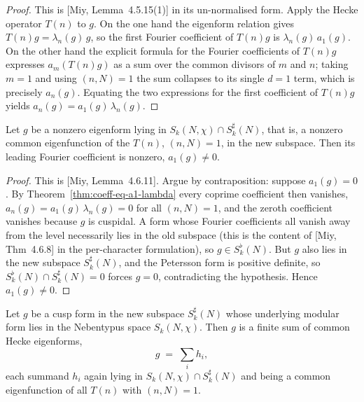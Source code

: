 \begin{proof}
\leanok
This is [Miy, Lemma~4.5.15(1)] in its un-normalised form. Apply the Hecke operator $T(n)$ to $g$. On the
one hand the eigenform relation gives $T(n)g=\lambda_n(g)\,g$, so the first Fourier coefficient of $T(n)g$
is $\lambda_n(g)\,a_1(g)$. On the other hand the explicit formula for the Fourier coefficients of $T(n)g$
expresses $a_m(T(n)g)$ as a sum over the common divisors of $m$ and $n$; taking $m=1$ and using $(n,N)=1$
the sum collapses to its single $d=1$ term, which is precisely $a_n(g)$. Equating the two expressions for
the first coefficient of $T(n)g$ yields $a_n(g)=a_1(g)\,\lambda_n(g)$.
\end{proof}

\begin{theorem}\label{thm:a1-ne-zero}
\leanok
Let $g$ be a nonzero eigenform lying in $S_k(N,\chi)\cap S_k^{\sharp}(N)$, that is, a nonzero common
eigenfunction of the $T(n)$, $(n,N)=1$, in the new subspace. Then its leading Fourier coefficient is
nonzero, $a_1(g)\neq 0$.
\end{theorem}

\begin{proof}
\leanok
This is [Miy, Lemma~4.6.11]. Argue by contraposition: suppose $a_1(g)=0$. By
Theorem~\ref{thm:coeff-eq-a1-lambda} every coprime coefficient then vanishes,
$a_n(g)=a_1(g)\,\lambda_n(g)=0$ for all $(n,N)=1$, and the zeroth coefficient vanishes because $g$ is
cuspidal. A form whose Fourier coefficients all vanish away from the level necessarily lies in the old
subspace (this is the content of [Miy, Thm~4.6.8] in the per-character formulation), so $g\in S_k^{\flat}(N)$.
But $g$ also lies in the new subspace $S_k^{\sharp}(N)$, and the Petersson form is positive definite, so
$S_k^{\flat}(N)\cap S_k^{\sharp}(N)=0$ forces $g=0$, contradicting the hypothesis. Hence $a_1(g)\neq 0$.
\end{proof}

\begin{theorem}\label{thm:eigenform-decomp}
\leanok
Let $g$ be a cusp form in the new subspace $S_k^{\sharp}(N)$ whose underlying modular form lies in the
Nebentypus space $S_k(N,\chi)$. Then $g$ is a finite sum of common Hecke eigenforms,
\[
  g \;=\; \sum_{i} h_i,
\]
each summand $h_i$ again lying in $S_k(N,\chi)\cap S_k^{\sharp}(N)$ and being a common eigenfunction of all
$T(n)$ with $(n,N)=1$.
\end{theorem}

